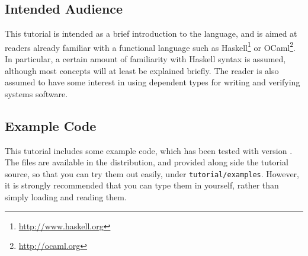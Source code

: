 \subsection{Intended Audience}

This tutorial is intended as a brief introduction to the language, and is aimed at readers already familiar with a functional language such as Haskell\footnote{\url{http://www.haskell.org}} or OCaml\footnote{\url{http://ocaml.org}}.
In particular, a certain amount of familiarity with Haskell syntax is assumed, although most concepts will at least be explained briefly.
The reader is also assumed to have some interest in using dependent types for writing and verifying systems software.

\subsection{Example Code}

This tutorial includes some example code, which has been tested with \Idris{} version \version{}.
The files are available in the \Idris{} distribution, and provided along side the tutorial source, so that you can try them out easily, under \texttt{tutorial/examples}.
However, it is strongly recommended that you can type them in yourself, rather than simply loading and reading them.

